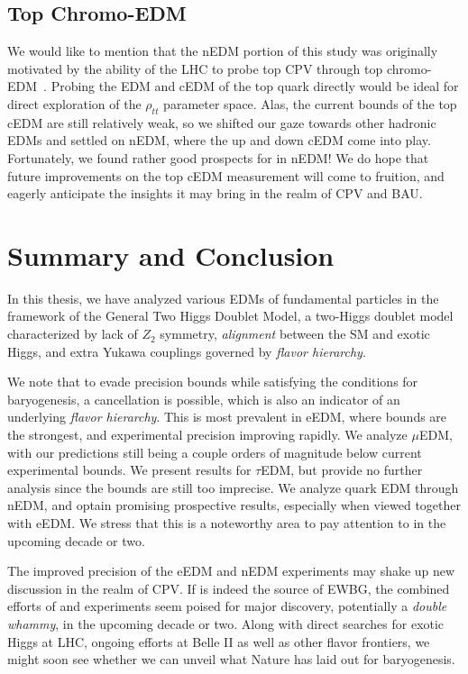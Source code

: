 \subsection{Top Chromo-EDM}\label{sec:top-cedm}
We would like to mention that the nEDM portion of this study was originally motivated by the ability of the LHC to probe top CPV through top chromo-EDM~\cite{CMS2023}.
Probing the EDM and cEDM of the top quark directly would be ideal for direct exploration of the \(\rho_{tt} \) parameter space.
Alas, the current bounds of the top cEDM are still relatively weak, so we shifted our gaze towards other hadronic EDMs and settled on nEDM, 
where the up and down cEDM come into play.
Fortunately, we found rather good prospects for {\gthdm} in nEDM!
We do hope that future improvements on the top cEDM measurement will come to fruition,
and eagerly anticipate the insights it may bring in the realm of CPV and BAU.

\section{Summary and Conclusion}
In this thesis, we have analyzed various EDMs of fundamental particles in the framework of  the General Two Higgs Doublet Model,
a two-Higgs doublet model characterized by lack of \(Z_{2} \) symmetry, \textit{alignment} between the SM and exotic Higgs, and extra Yukawa couplings governed by \textit{flavor hierarchy}.

We note that to evade precision bounds while satisfying the conditions for baryogenesis, a cancellation is possible,
which is also an indicator of an underlying \textit{flavor hierarchy}.
This is most prevalent in eEDM, where bounds are the strongest, and experimental precision improving rapidly.
We analyze \(\mu \)EDM, with our predictions still being a couple orders of magnitude below current experimental bounds.
We present results for \(\tau \)EDM, but provide no further analysis since the bounds are still too imprecise.
We analyze quark EDM through nEDM, and optain promising prospective results, especially when viewed together with eEDM.
We stress that this is a noteworthy area to pay attention to in the upcoming decade or two.

The improved precision of the eEDM and nEDM experiments may shake up new discussion in the realm of CPV.
If {\gthdm} is indeed the source of EWBG, 
the combined efforts of {\eedm} and {\nedm} experiments seem poised for major discovery, 
potentially a \emph{double whammy}, in the upcoming decade or two.
Along with direct searches for exotic Higgs at LHC, ongoing efforts at Belle II as well as other flavor frontiers,
we might soon see whether we can unveil what Nature has laid out for baryogenesis.